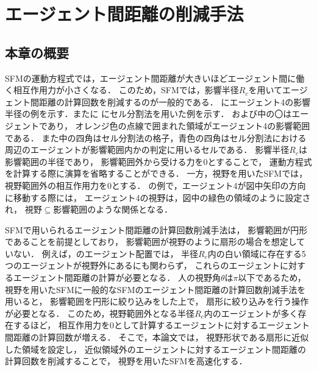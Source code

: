 \chapter{エージェント間距離の削減手法}
\label{sec:method}
\section{本章の概要}
SFMの運動方程式では，エージェント間距離が大きいほどエージェント間に働く相互作用力が小さくなる．
このため，SFMでは，影響半径$R_{c}$を用いてエージェント間距離の計算回数を削減するのが一般的である．
にエージェント4の影響半径の例を示す．またに
にセル分割法を用いた例を示す．
%
%
%
および中の〇はエージェントであり，
オレンジ色の点線で囲まれた領域がエージェント4の影響範囲である．
また中の四角はセル分割法の格子，青色の四角はセル分割法における
周辺のエージェントが影響範囲内かの判定に用いるセルである．
影響半径$R_{c}$は影響範囲の半径であり，
影響範囲外から受ける力を0とすることで，
運動方程式を計算する際に演算を省略することができる．
一方，視野を用いたSFMでは，視野範囲外の相互作用力を0とする．
の例で，エージェント4が図中矢印の方向に移動する際には，
エージェント4の視野は，図中の緑色の領域のように設定され，
視野$\subseteq$影響範囲のような関係となる．

SFMで用いられるエージェント間距離の計算回数削減手法は，
影響範囲が円形であることを前提としており，
影響範囲が視野のように扇形の場合を想定していない．
例えば，のエージェント配置では，
半径$R_{c}$内の白い領域に存在する5つのエージェントが視野外にあるにも関わらず，
これらのエージェントに対するエージェント間距離の計算が必要となる．
人の視野角$\theta$は$\pi$以下であるため，
視野を用いたSFMに一般的なSFMのエージェント間距離の計算回数削減手法を用いると，
影響範囲を円形に絞り込みをした上で，%
扇形に絞り込みを行う操作が必要となる．
このため，視野範囲外となる半径$R_{c}$内のエージェントが多く存在するほど，
相互作用力を0として計算するエージェントに対するエージェント間距離の計算回数が増える．
そこで，本論文では，
視野形状である扇形に近似した領域を設定し，
近似領域外のエージェントに対するエージェント間距離の計算回数を削減することで，
視野を用いたSFMを高速化する．

